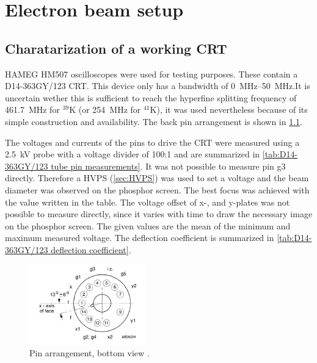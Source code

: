 \chapter{Electron beam setup}
\label{ch:Electron beam setup}

\section{Charatarization of a working CRT}
\label{sec:Charatarization of a working CRT}

HAMEG HM507 oscilloscopes \autocite{HM507-manual} were used for testing purposes. These contain a D14-363GY/123 \autocite{D14363GY123-manual} CRT. This device only has a bandwidth of \SIrange{0}{50}{\mega\hertz}.It is uncertain wether this is sufficient to reach the hyperfine splitting frequency of \SI{461.7}{\mega\hertz} for $^{39}\mathrm{K}$ \cite{tiecke:potassium-properties} (or \SI{254}{\mega\hertz} for $^{41}\mathrm{K}$), it was used nevertheless because of its simple construction and availability. The back pin arrangement is shown in \cref{fig:pin arrangement}.

The voltages and currents of the pins to drive the CRT were measured using a \SI{2.5}{\kilo\volt} probe with a voltage divider of 100:1 and are summarized in \cref{tab:D14-363GY/123 tube pin measurements}. It was not possible to measure pin g3 directly. Therefore a HVPS (\cref{sec:HVPS}) was used to set a voltage and the beam diameter was observed on the phosphor screen. The best focus was achieved with the value written in the table. The voltage offset of x-, and y-plates was not possible to measure directly, since it varies with time to draw the necessary image on the phosphor screen. The given values are the mean of the minimum and maximum measured voltage. The deflection coefficient is summarized in \cref{tab:D14-363GY/123 deflection coefficient}.

\begin{figure}[ht]
	\centering
	\includegraphics[width=5cm]{./Chapters/e-beam-setup/pin arrangement}
	\caption{Pin arrangement, bottom view \autocite{D14363GY123-manual}.}
	\label{fig:pin arrangement}
\end{figure}


